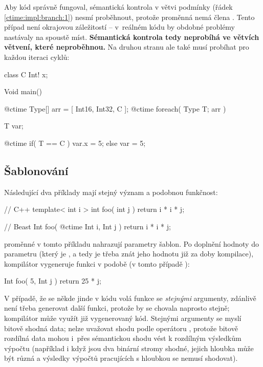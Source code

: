 Aby kód správně fungoval, sémantická kontrola v  větvi podmínky (řádek \ref{ctime:impl:branch:1}) nesmí proběhnout, protože proměnná  nemá člena . Tento případ není okrajovou záležitostí -- v~reálném \ctime kódu by obdobné problémy nastávaly na spoustě míst. \textbf{Sémantická kontrola tedy neprobíhá ve větvích \ctime větvení, které neproběhnou.} Na druhou stranu ale také musí probíhat pro každou iteraci cyklů:

\begin{code}
class C { 
	Int! x;
}
	
Void main() {
	@ctime Type[] arr = [ Int16, Int32, C ];
	@ctime foreach( Type T; arr ) {
		T var;
		
		@ctime if( T == C )
			var.x = 5;
		else
			var = 5;
	}
}
\end{code}

\subsection{Šablonování}
Následující dva příklady mají stejný význam a podobnou funkčnost:
\begin{cppcode}
// C++
template< int i >
int foo( int j ) {
	return i * i * j;
}
\end{cppcode}

\begin{code}
// Beast
Int foo( @ctime Int i, Int j ) {
	return i * i * j;
}
\end{code}

\ctime proměnné v tomto příkladu nahrazují parametry šablon. Po doplnění hodnoty do parametru  (který je \ctime, a tedy je třeba znát jeho hodnotu již za doby kompilace), kompilátor vygeneruje funkci v podobě (v tomto případě ):

\begin{code}
Int foo( 5, Int j ) {
	return 25 * j;
}
\end{code}

V případě, že se někde jinde v kódu volá funkce  se \textit{stejnými} \ctime argumenty, zdánlivě není třeba generovat další funkci, protože by se chovala naprosto stejně; kompilátor může využít již vygenerovaný kód. Stejnými \ctime argumenty se myslí bitově shodná data; nelze uvažovat shodu podle operátoru \inlineCode{==}, protože bitově rozdílná data mohou i~přes sémantickou shodu vést k rozdílným výsledkům výpočtu (například i když jsou dva binární stromy shodné, jejich hloubka může být různá a výsledky výpočtů pracujících s hloubkou se nemusí shodovat).

